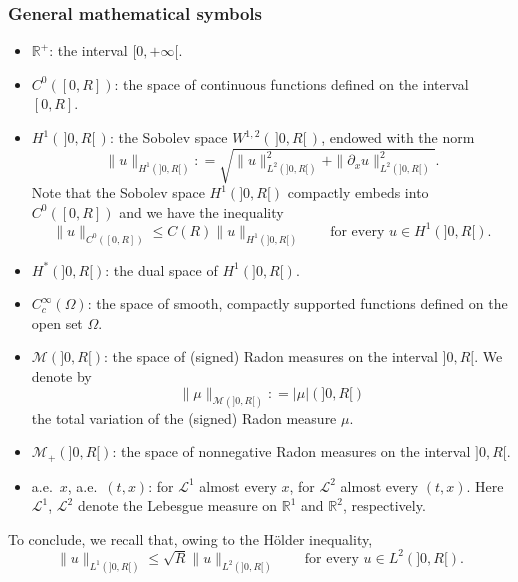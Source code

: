 \documentclass[11pt,leqno]{amsart}
\numberwithin{equation}{section}
\begin{document}
\subsubsection*{General mathematical symbols}
\begin{itemize}
\item ${\mathbb{R}}^+$: the interval $[0, + \infty[$. 
\item $C^0 ([0, R])$: the space of continuous functions defined on the interval $[0, R]$.
\item $H^1 (\, ]0, R[ \,)$: the Sobolev space $W^{1, 2} (\, ]0, R[ \, )$, endowed with the norm
$$
    \| u \|_{H^1(]0, R[ )} : =  \sqrt{ \| u \|^2_{L^2(]0, R[ )} + \| \partial_x u \|^2_{L^2(]0, R[ )}  }. 
$$
Note that the Sobolev space $H^1(]0, R[ )$ compactly embeds into
$C^0([0, R])$ and we have the inequality
\begin{equation}
\label{e:immersione}
    \| u \|_{C^0 ([0, R])} \leq C(R) \| u \|_{H^1 (]0, R[)}
    \qquad \text{for every $u \in H^1 (]0, R[)$}.
\end{equation}
\item $H^\ast (]0, R[ )$: the dual space of $H^1 ( ]0, R[  ).$
\item $C^\infty_c (\Omega)$: the space of smooth, compactly supported functions defined on the open set $\Omega$.   
\item $\mathcal M (]0, R[)$: the space of (signed) Radon measures on the interval $]0, R[$. We denote by 
  \begin{equation*}
    \| \mu \|_{\mathcal M(]0, R[)} : = |\mu| (]0, R[)
  \end{equation*}
the total variation of the (signed) Radon measure $\mu$. 
\item $\mathcal M_+ (]0, R[)$: the space of nonnegative Radon measures on the interval $]0, R[$.
\item a.e.~$x$, a.e.~$(t, x)$: for $\mathcal L^1$ almost every $x$, for 
$\mathcal L^2$ almost every $(t, x)$. Here $\mathcal L^1$, $\mathcal L^2$ denote the Lebesgue measure on ${\mathbb{R}}^1$ and ${\mathbb{R}}^2$, respectively. 
\end{itemize}
To conclude, we recall that, owing to the H\"older inequality,
\begin{equation}
\label{e:elledueelleuno}
    \| u \|_{L^1 (]0, R[)} \leq \sqrt{R} \| u \|_{L^2 (]0, R[)}
    \qquad \text{for every $u \in L^2 (]0, R[)$}.
\end{equation}
\end{document}
